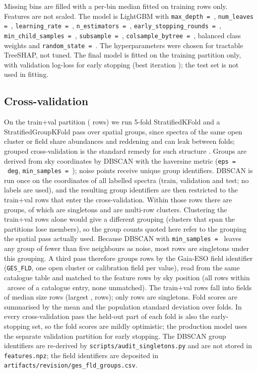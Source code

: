 \documentclass[11pt,a4paper]{article}
\begin{document}
Missing bins are filled with a per-bin median fitted on training rows only. Features are not scaled. The model is LightGBM with \texttt{max\_depth = \hpDepth}, \texttt{num\_leaves = \hpLeaves}, \texttt{learning\_rate = \hpLr}, \texttt{n\_estimators = \hpNEst}, \texttt{early\_stopping\_rounds = \hpEarly}, \texttt{min\_child\_samples = \hpMinChild}, \texttt{subsample = \hpSub}, \texttt{colsample\_bytree = \hpCol}, balanced class weights and \texttt{random\_state = \hpSeed}. The hyperparameters were chosen for tractable TreeSHAP, not tuned. The final model is fitted on the training partition only, with validation log-loss for early stopping (best iteration \bestIter); the test set is not used in fitting.

\subsection{Cross-validation}
\label{subsec:cv}

On the train+val partition (\nTrainVal{} rows) we run 5-fold StratifiedKFold and a StratifiedGroupKFold pass over spatial groups, since spectra of the same open cluster or field share abundances and reddening and can leak between folds; grouped cross-validation is the standard remedy for such structure \citep{Roberts2017CV}. Groups are derived from sky coordinates by DBSCAN with the haversine metric (\texttt{eps = \dbscanEps~deg}, \texttt{min\_samples = \dbscanMin}); noise points receive unique group identifiers. DBSCAN is run once on the coordinates of all \nClusterRows{} labelled spectra (train, validation and test; no labels are used), and the resulting group identifiers are then restricted to the \nTrainVal{} train+val rows that enter the cross-validation. Within those rows there are \nSpatGroups{} groups, of which \nSingleton{} are singletons and \nClusters{} are multi-row clusters. Clustering the train+val rows alone would give a different grouping (clusters that span the partitions lose members), so the group counts quoted here refer to the grouping the spatial pass actually used. Because DBSCAN with \texttt{min\_samples = \dbscanMin} leaves any group of fewer than five neighbours as noise, most rows are singletons under this grouping. A third pass therefore groups rows by the Gaia-ESO field identifier (\texttt{GES\_FLD}, one open cluster or calibration field per value), read from the same catalogue table and matched to the feature rows by sky position (all \nClusterRows{} rows within \cvFldMatchMaxSep~arcsec of a catalogue entry, none unmatched). The train+val rows fall into \cvFldNGroups{} fields of median size \cvFldMedianSize{} rows (largest \texttt{\cvFldLargestName}, \cvFldLargest{} rows); only \cvFldNSingleton{} rows are singletons. Fold scores are summarised by the mean and the population standard deviation over folds. In every cross-validation pass the held-out part of each fold is also the early-stopping set, so the fold scores are mildly optimistic; the production model uses the separate validation partition for early stopping. The DBSCAN group identifiers are re-derived by \texttt{scripts/audit\_singletons.py} and are not stored in \texttt{features.npz}; the field identifiers are deposited in \texttt{artifacts/revision/ges\_fld\_groups.csv}.
\end{document}
